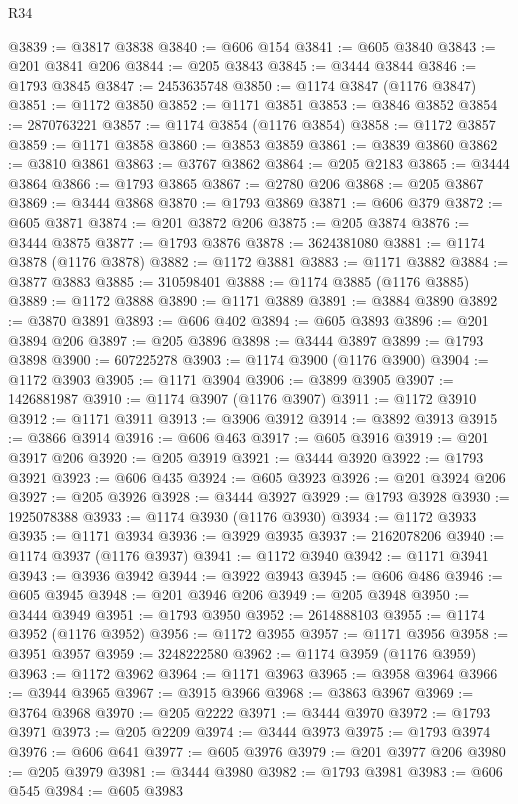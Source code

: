 \begin{lexlean}{R34}
\begin{coremodule}
@3839 := @3817 @3838
@3840 := @606 @154
@3841 := @605 @3840
@3843 := @201 @3841 @206
@3844 := @205 @3843
@3845 := @3444 @3844
@3846 := @1793 @3845
@3847 := 2453635748
@3850 := @1174 @3847 (@1176 @3847)
@3851 := @1172 @3850
@3852 := @1171 @3851
@3853 := @3846 @3852
@3854 := 2870763221
@3857 := @1174 @3854 (@1176 @3854)
@3858 := @1172 @3857
@3859 := @1171 @3858
@3860 := @3853 @3859
@3861 := @3839 @3860
@3862 := @3810 @3861
@3863 := @3767 @3862
@3864 := @205 @2183
@3865 := @3444 @3864
@3866 := @1793 @3865
@3867 := @2780 @206
@3868 := @205 @3867
@3869 := @3444 @3868
@3870 := @1793 @3869
@3871 := @606 @379
@3872 := @605 @3871
@3874 := @201 @3872 @206
@3875 := @205 @3874
@3876 := @3444 @3875
@3877 := @1793 @3876
@3878 := 3624381080
@3881 := @1174 @3878 (@1176 @3878)
@3882 := @1172 @3881
@3883 := @1171 @3882
@3884 := @3877 @3883
@3885 := 310598401
@3888 := @1174 @3885 (@1176 @3885)
@3889 := @1172 @3888
@3890 := @1171 @3889
@3891 := @3884 @3890
@3892 := @3870 @3891
@3893 := @606 @402
@3894 := @605 @3893
@3896 := @201 @3894 @206
@3897 := @205 @3896
@3898 := @3444 @3897
@3899 := @1793 @3898
@3900 := 607225278
@3903 := @1174 @3900 (@1176 @3900)
@3904 := @1172 @3903
@3905 := @1171 @3904
@3906 := @3899 @3905
@3907 := 1426881987
@3910 := @1174 @3907 (@1176 @3907)
@3911 := @1172 @3910
@3912 := @1171 @3911
@3913 := @3906 @3912
@3914 := @3892 @3913
@3915 := @3866 @3914
@3916 := @606 @463
@3917 := @605 @3916
@3919 := @201 @3917 @206
@3920 := @205 @3919
@3921 := @3444 @3920
@3922 := @1793 @3921
@3923 := @606 @435
@3924 := @605 @3923
@3926 := @201 @3924 @206
@3927 := @205 @3926
@3928 := @3444 @3927
@3929 := @1793 @3928
@3930 := 1925078388
@3933 := @1174 @3930 (@1176 @3930)
@3934 := @1172 @3933
@3935 := @1171 @3934
@3936 := @3929 @3935
@3937 := 2162078206
@3940 := @1174 @3937 (@1176 @3937)
@3941 := @1172 @3940
@3942 := @1171 @3941
@3943 := @3936 @3942
@3944 := @3922 @3943
@3945 := @606 @486
@3946 := @605 @3945
@3948 := @201 @3946 @206
@3949 := @205 @3948
@3950 := @3444 @3949
@3951 := @1793 @3950
@3952 := 2614888103
@3955 := @1174 @3952 (@1176 @3952)
@3956 := @1172 @3955
@3957 := @1171 @3956
@3958 := @3951 @3957
@3959 := 3248222580
@3962 := @1174 @3959 (@1176 @3959)
@3963 := @1172 @3962
@3964 := @1171 @3963
@3965 := @3958 @3964
@3966 := @3944 @3965
@3967 := @3915 @3966
@3968 := @3863 @3967
@3969 := @3764 @3968
@3970 := @205 @2222
@3971 := @3444 @3970
@3972 := @1793 @3971
@3973 := @205 @2209
@3974 := @3444 @3973
@3975 := @1793 @3974
@3976 := @606 @641
@3977 := @605 @3976
@3979 := @201 @3977 @206
@3980 := @205 @3979
@3981 := @3444 @3980
@3982 := @1793 @3981
@3983 := @606 @545
@3984 := @605 @3983

\end{coremodule}
\end{lexlean}
